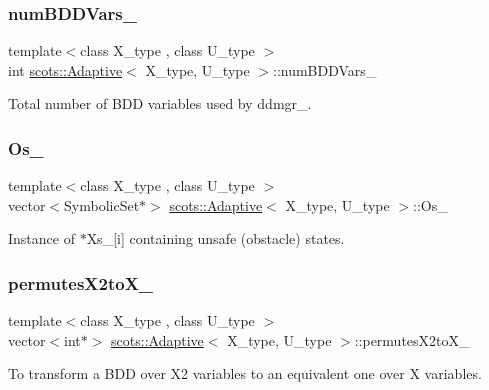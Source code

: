 \subsubsection{\texorpdfstring{num\+B\+D\+D\+Vars\+\_\+}{numBDDVars\_}}
{\footnotesize\ttfamily template$<$class X\+\_\+type , class U\+\_\+type $>$ \\
int \hyperlink{classscots_1_1Adaptive}{scots\+::\+Adaptive}$<$ X\+\_\+type, U\+\_\+type $>$\+::num\+B\+D\+D\+Vars\+\_\+}

Total number of B\+DD variables used by ddmgr\+\_\+. \mbox{\label{classscots_1_1Adaptive_abed6bfd1256157d4b943078f6486ee36}} 
\subsubsection{\texorpdfstring{Os\+\_\+}{Os\_}}
{\footnotesize\ttfamily template$<$class X\+\_\+type , class U\+\_\+type $>$ \\
vector$<$Symbolic\+Set$\ast$$>$ \hyperlink{classscots_1_1Adaptive}{scots\+::\+Adaptive}$<$ X\+\_\+type, U\+\_\+type $>$\+::Os\+\_\+}

Instance of $\ast$\+Xs\+\_\+\mbox{[}i\mbox{]} containing unsafe (obstacle) states. \mbox{\label{classscots_1_1Adaptive_a88edb6662310c07120d07c9dff968ddc}} 
\subsubsection{\texorpdfstring{permutes\+X2to\+X\+\_\+}{permutesX2toX\_}}
{\footnotesize\ttfamily template$<$class X\+\_\+type , class U\+\_\+type $>$ \\
vector$<$int$\ast$$>$ \hyperlink{classscots_1_1Adaptive}{scots\+::\+Adaptive}$<$ X\+\_\+type, U\+\_\+type $>$\+::permutes\+X2to\+X\+\_\+}

To transform a B\+DD over X2 variables to an equivalent one over X variables. \mbox{\label{classscots_1_1Adaptive_ae954d4d3177bdc4093530e254ace2b34}} 
